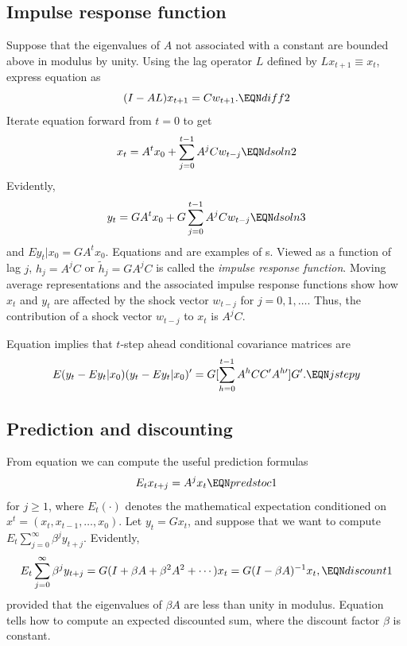 %
\subsection{Impulse response function}
Suppose that the eigenvalues of $A$ not associated with
a constant are bounded above in modulus  by unity.  Using
the lag operator $L$ defined by $L x_{t+1} \equiv x_t$,
express equation  as
$$ (I - A L) x_{t+1} = C w_{t+1} . \EQN diff2 $$
Iterate equation  forward from
$t=0$ to get
$$ x_t = A^t x_0 + \sum_{j=0}^{t-1} A^j C w_{t-j}
  \EQN dsoln2 $$
Evidently, $$ y_t =G A^t x_0 + G\sum_{j=0}^{t-1} A^j C w_{t-j}
  \EQN dsoln3 $$
and $E y_t | x_0 = G A^t x_0$.
Equations %
  and 
 are examples of
 s.
Viewed as a function of lag $j$, $h_j = A^j C$  or $\tilde h_j = G
A^j C$  is called
the {\it impulse response function\/}.
%
  Moving average representations
and the associated impulse response functions show
how $x_{t}$ and $y_{t}$ are affected by
the shock vector $w_{t-j}$ for $j=0, 1, \ldots$.  Thus, the contribution of a shock vector
$w_{t-j}$ to $x_t$ is $A^jC$.

Equation  implies that  $t$-step ahead conditional covariance matrices
are
$$ E(y_t - E y_t | x_0)(y_t - E y_t | x_0)'
= G[ \sum_{h=0}^{t-1} A^h C C' A^{h \prime} ] G'. \EQN jstepy $$
 
\subsection{Prediction and discounting}
  From equation  we can compute the useful prediction formulas
$$ E_t x_{t+j} = A^j x_t \EQN predstoc1  $$
for $j \geq 1$, where $E_t(\cdot)$ denotes the mathematical
expectation conditioned on $x^t = (x_t, x_{t-1}, \ldots, x_0)$.
Let $y_t = G x_t$, and  suppose that we want to compute
$ E_t \sum_{j=0}^\infty \beta^j y_{t+j} $.
Evidently,
$$ E_t \sum_{j=0}^\infty \beta^j y_{t+j} = G(I + \beta A + \beta^2 A^2 + \cdots) x_t =  G(I -\beta A)^{-1} x_t,
\EQN discount1 $$
provided that the eigenvalues of $\beta A$ are less than
unity in modulus.  Equation  tells  how to compute
an expected discounted sum, where the discount factor $\beta$ is
constant.

